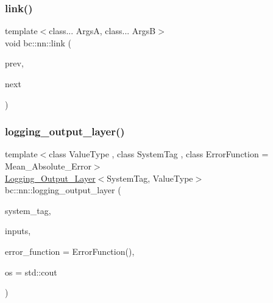 \subsubsection{\texorpdfstring{link()}{link()}}
{\footnotesize\ttfamily template$<$class... ArgsA, class... ArgsB$>$ \\
void bc\+::nn\+::link (\begin{DoxyParamCaption}\item[{std\+::shared\+\_\+ptr$<$ \hyperlink{structbc_1_1nn_1_1Layer__Base}{Layer\+\_\+\+Base}$<$ Args\+A... $>$$>$}]{prev,  }\item[{std\+::shared\+\_\+ptr$<$ \hyperlink{structbc_1_1nn_1_1Layer__Base}{Layer\+\_\+\+Base}$<$ Args\+B... $>$$>$}]{next }\end{DoxyParamCaption})}

\mbox{\label{namespacebc_1_1nn_a0e09424bd9585d7fac8f168894315054}} 
\subsubsection{\texorpdfstring{logging\+\_\+output\+\_\+layer()}{logging\_output\_layer()}\hspace{0.1cm}{\footnotesize\ttfamily [1/3]}}
{\footnotesize\ttfamily template$<$class Value\+Type , class System\+Tag , class Error\+Function  = Mean\+\_\+\+Absolute\+\_\+\+Error$>$ \\
\hyperlink{structbc_1_1nn_1_1Logging__Output__Layer}{Logging\+\_\+\+Output\+\_\+\+Layer}$<$System\+Tag, Value\+Type$>$ bc\+::nn\+::logging\+\_\+output\+\_\+layer (\begin{DoxyParamCaption}\item[{System\+Tag}]{system\+\_\+tag,  }\item[{\hyperlink{namespacebc_aaf8e3fbf99b04b1b57c4f80c6f55d3c5}{bc\+::size\+\_\+t}}]{inputs,  }\item[{Error\+Function}]{error\+\_\+function = {\ttfamily ErrorFunction()},  }\item[{std\+::ostream \&}]{os = {\ttfamily std\+:\+:cout} }\end{DoxyParamCaption})}

\mbox{\label{namespacebc_1_1nn_acb61279448bd2071e5ecdb743b6109a4}} 
